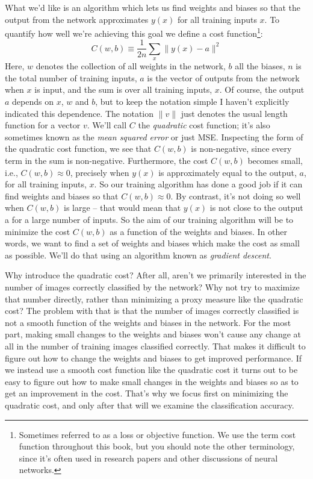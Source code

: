 \documentclass[a4paper,twoside,10pt]{book}
\begin{document}
What we'd like is an algorithm which lets us find weights and biases so that the output from the network approximates $y(x)$ for all training inputs $x$. To quantify how well we're achieving this goal we define a cost function\footnote{Sometimes referred to as a loss or objective function. We use the term cost function throughout this book, but you should note the other terminology, since it's often used in research papers and other discussions of neural networks.}:
\begin{equation}
	C(w,b) \equiv\frac1{2n}\sum_x\|y(x)-a\|^2
	\label{eq:6}
\end{equation}
Here, $w$ denotes the collection of all weights in the network, $b$ all the biases, $n$ is the total number of training inputs, $a$ is the vector of outputs from the network when $x$ is input, and the sum is over all training inputs, $x$. Of course, the output $a$ depends on $x$, $w$ and $b$, but to keep the notation simple I haven't explicitly indicated this dependence. The notation $\|v\|$ just denotes the usual length function for a vector $v$. We'll call $C$ the \textit{quadratic} cost function; it's also sometimes known as the \textit{mean squared error} or just MSE. Inspecting the form of the quadratic cost function, we see that $C(w,b)$ is non-negative, since every term in the sum is non-negative. Furthermore, the cost $C(w,b)$ becomes small, i.e., $C(w,b)\approx0$, precisely when $y(x)$ is approximately equal to the output, $a$, for all training inputs, $x$. So our training algorithm has done a good job if it can find weights and biases so that $C(w,b)\approx0$. By contrast, it's not doing so well when $C(w,b)$ is large -- that would mean that $y(x)$ is not close to the output a for a large number of inputs. So the aim of our training algorithm will be to minimize the cost $C(w,b)$ as a function of the weights and biases. In other words, we want to find a set of weights and biases which make the cost as small as possible. We'll do that using an algorithm known as \textit{gradient descent}.

Why introduce the quadratic cost? After all, aren't we primarily interested in the number of images correctly classified by the network? Why not try to maximize that number directly, rather than minimizing a proxy measure like the quadratic cost? The problem with that is that the number of images correctly classified is not a smooth function of the weights and biases in the network. For the most part, making small changes to the weights and biases won't cause any change at all in the number of training images classified correctly. That makes it difficult to figure out how to change the weights and biases to get improved performance. If we instead use a smooth cost function like the quadratic cost it turns out to be easy to figure out how to make small changes in the weights and biases so as to get an improvement in the cost. That's why we focus first on minimizing the quadratic cost, and only after that will we examine the classification accuracy.
\end{document}
